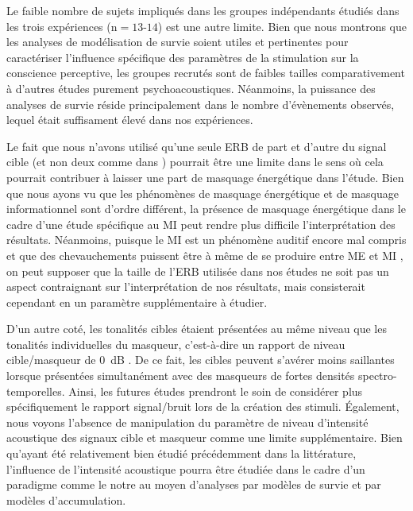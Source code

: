 Le faible nombre de sujets impliqués dans les groupes indépendants étudiés dans les trois expériences (n$=13$-$14$) est une autre limite. 
Bien que nous montrons que les analyses de modélisation de survie soient utiles et pertinentes pour caractériser l'influence spécifique des paramètres de la stimulation sur la conscience perceptive, les groupes recrutés sont de faibles tailles comparativement à d'autres études purement psychoacoustiques. 
Néanmoins, la puissance des analyses de survie réside principalement dans le nombre d'évènements observés, lequel était suffisament élevé dans nos expériences. 

Le fait que nous n'avons utilisé qu'une seule ERB de part et d'autre du signal cible (et non deux comme dans \cite{gutschalk2008neural}) pourrait être une limite dans le sens où cela pourrait contribuer à laisser une part de masquage énergétique dans l'étude. 
Bien que nous ayons vu que les phénomènes de masquage énergétique et de masquage informationnel sont d'ordre différent, la présence de masquage énergétique dans le cadre d'une étude spécifique au MI peut rendre plus difficile l'interprétation des résultats. 
Néanmoins, puisque le MI est un phénomène auditif encore mal compris et que des chevauchements puissent être à même de se produire entre ME et MI \citep{durlach2006auditory}, on peut supposer que la taille de l'ERB utilisée dans nos études ne soit pas un aspect contraignant sur l'interprétation de nos résultats, mais consisterait cependant en un paramètre supplémentaire à étudier. 

D'un autre coté, les tonalités cibles étaient présentées au même niveau que les tonalités individuelles du masqueur, c'est-à-dire un rapport de niveau cible/masqueur de $0$~dB \citep{dykstra2016neural}. 
De ce fait, les cibles peuvent s'avérer moins saillantes lorsque présentées simultanément avec des masqueurs de fortes densités spectro-temporelles. 
Ainsi, les futures études prendront le soin de considérer plus spécifiquement le rapport signal/bruit lors de la création des stimuli. 
Également, nous voyons l'absence de manipulation du paramètre de niveau d'intensité acoustique des signaux cible et masqueur comme une limite supplémentaire. 
Bien qu'ayant été relativement bien étudié précédemment dans la littérature, l'influence de l'intensité acoustique pourra être étudiée dans le cadre d'un paradigme comme le notre au moyen d'analyses par modèles de survie et par modèles d'accumulation. 

